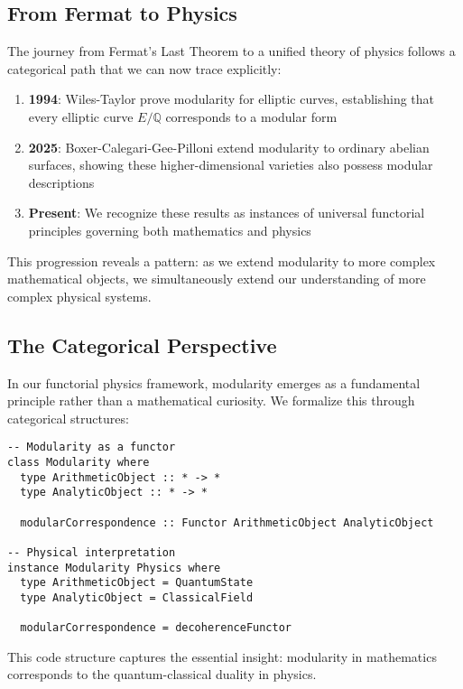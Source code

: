 \documentclass[12pt,a4paper]{article}
\begin{document}
\subsection{From Fermat to Physics}

The journey from Fermat's Last Theorem to a unified theory of physics follows a categorical path that we can now trace explicitly:

\begin{enumerate}
\item \textbf{1994}: Wiles-Taylor prove modularity for elliptic curves, establishing that every elliptic curve $E/\mathbb{Q}$ corresponds to a modular form
\item \textbf{2025}: Boxer-Calegari-Gee-Pilloni extend modularity to ordinary abelian surfaces, showing these higher-dimensional varieties also possess modular descriptions
\item \textbf{Present}: We recognize these results as instances of universal functorial principles governing both mathematics and physics
\end{enumerate}

This progression reveals a pattern: as we extend modularity to more complex mathematical objects, we simultaneously extend our understanding of more complex physical systems.

\subsection{The Categorical Perspective}

In our functorial physics framework, modularity emerges as a fundamental principle rather than a mathematical curiosity. We formalize this through categorical structures:

\begin{lstlisting}[style=haskell]
-- Modularity as a functor
class Modularity where
  type ArithmeticObject :: * -> *
  type AnalyticObject :: * -> *
  
  modularCorrespondence :: Functor ArithmeticObject AnalyticObject
  
-- Physical interpretation
instance Modularity Physics where
  type ArithmeticObject = QuantumState
  type AnalyticObject = ClassicalField
  
  modularCorrespondence = decoherenceFunctor
\end{lstlisting}

This code structure captures the essential insight: modularity in mathematics corresponds to the quantum-classical duality in physics.
\end{document}
